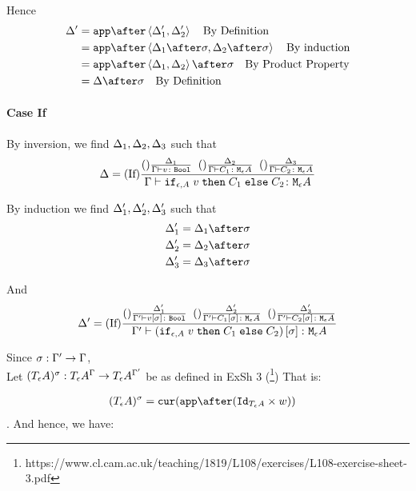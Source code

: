 {    Hence
    \begin{align}
        \D' &= \app\after\pr{\D_1'}{\D_2'}\qt{By Definition}\\
            &= \app\after\pr{\D_1\after\si}{\D_2\after\si}\qt{By induction}\\
            &= \app\after\pr{\D_1}{\D_2}\after\si\qt{By Product Property}\\
            & = \D\after\si\qt{By Definition}\\
    \end{align}

    \paragraph{Case If}


    By inversion, we find $\Delta_1, \Delta_2, \Delta_3$ such that
    \begin{equation}
        \Delta = (\text{If}) \frac{(\text{}) \frac{\Delta_1}{\Gamma \vdash v \colon \texttt{Bool}}\;\;(\text{}) \frac{\Delta_2}{\Gamma \vdash C_1 \colon \texttt{M}_{\epsilon}{A}}\;\;(\text{}) \frac{\Delta_3}{\Gamma \vdash C_2 \colon \texttt{M}_{\epsilon}{A}}}{\Gamma \vdash \texttt{if}_{\epsilon, A}\; v\; \texttt{then}\; C_1 \;\texttt{else} \; C_2 \colon \texttt{M}_{\epsilon}{A}}
    \end{equation}

    By induction we find $\Delta_1', \Delta_2', \Delta_3'$ such that 
    \begin{align}
        \D_1' &= \D_1\after\si\\
        \D_2' &= \D_2\after\si\\
        \D_3' &= \D_3\after\si\\
    \end{align}

    And
    \begin{equation}
        \Delta' = (\text{If}) \frac{(\text{}) \frac{\Delta_1'}{\Gamma' \vdash v\left[\sigma\right] \colon \texttt{Bool}}\;\;(\text{}) \frac{\Delta_2'}{\Gamma' \vdash C_1\left[\sigma\right] \colon \texttt{M}_{\epsilon}{A}}\;\;(\text{}) \frac{\Delta_3'}{\Gamma' \vdash C_2\left[\sigma\right] \colon \texttt{M}_{\epsilon}{A}}}{\Gamma' \vdash (\texttt{if}_{\epsilon, A}\; v\; \texttt{then}\; C_1 \;\texttt{else} \; C_2)\left[\sigma\right] \colon \texttt{M}_{\epsilon}{A}}
    \end{equation}

    Since $\sigma: \Gamma' \rightarrow \Gamma$, \\
    Let $(T_{\epsilon}{A})^{\sigma}: T_{\epsilon}{A}^{\Gamma}\rightarrow T_{\epsilon}{A}^{\Gamma'}$ be as defined in ExSh 3 (\footnote{https://www.cl.cam.ac.uk/teaching/1819/L108/exercises/L108-exercise-sheet-3.pdf})
    That is:

    \begin{align}
        (\tea)^{\si} & = \cur{\app\after(\Id{\tea}\times w)}
    \end{align}.
    And hence, we have:

}
